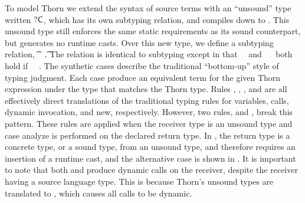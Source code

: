 \documentclass[acmlarge, anonymous, authordraft]{acmart}
\begin{document}
To model Thorn we extend the syntax of source terms with an ``unsound'' type
written ${\sf{?}}{\sf{C}}$, which has its own subtyping relation, and compiles down to
\any. This unsound type still enforces the same static requirements as its
sound counterpart, but generates no runtime casts.  Over this new type, we
define a subtyping relation, \t~\src\Sub~\t. The relation is identical to
\kafka subtyping except in that \dt\C~\src\Sub~\dt\D and \C~\src\Sub~\dt\D
both hold if \C~\src\Sub~\D.  The synthetic cases describe the traditional
``bottom-up'' style of typing judgment. Each case produce an equivalent
\kafka term for the given Thorn expression under the \kafka type that
matches the Thorn type. Rules , ,
, and  are all effectively direct translations
of the traditional typing rules for variables, calls, dynamic invocation,
and new, respectively.  However, two rules,  and
, break this pattern. These rules are applied when the
receiver type is an unsound type and case analyze is performed on the
declared return type. In , the return type is a concrete type,
or a sound type, from an unsound type, and therefore requires an insertion
of a runtime cast, and the alternative case is shown in . It
is important to note that both  and  produce
dynamic calls on the receiver, despite the receiver having a source language
type. This is because Thorn's unsound types are translated to \any, which
causes all calls to be dynamic.
\end{document}
